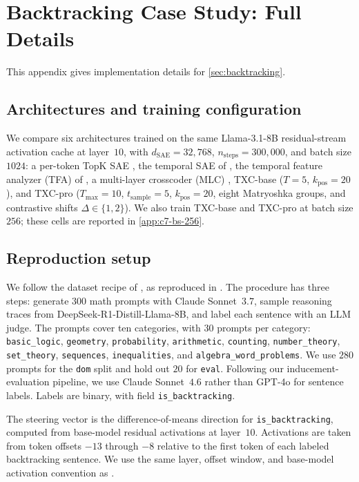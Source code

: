 \section{Backtracking Case Study: Full Details}
\label{app:c7}

This appendix gives implementation details for \cref{sec:backtracking}.

\subsection{Architectures and training configuration}
\label{app:c7-archs}

We compare six architectures trained on the same Llama-3.1-8B residual-stream activation cache at layer~$10$, with $d_{\text{SAE}} = 32{,}768$, $n_{\text{steps}} = 300{,}000$, and batch size $1024$: a per-token TopK SAE \cite{gao2024scaling}, the temporal SAE of \citet{bhalla2025tsae}, the temporal feature analyzer (TFA) of \citet{lubana2025priors}, a multi-layer crosscoder (MLC) \cite{lindsey2024sparsecrosscoders}, TXC-base ($T = 5$, $k_{\text{pos}} = 20$), and TXC-pro ($T_{\max} = 10$, $t_{\text{sample}} = 5$, $k_{\text{pos}} = 20$, eight Matryoshka groups, and contrastive shifts $\Delta \in \{1,2\}$). We also train TXC-base and TXC-pro at batch size $256$; these cells are reported in \cref{app:c7-bs-256}.

\subsection{Reproduction setup}
\label{app:c7-stage-a}

We follow the dataset recipe of \citet{venhoff2025steering}, as reproduced in \citet[Appendix C]{ward2025reasoning}. The procedure has three steps: generate $300$ math prompts with Claude Sonnet~$3.7$, sample reasoning traces from DeepSeek-R1-Distill-Llama-8B, and label each sentence with an LLM judge. The prompts cover ten categories, with $30$ prompts per category: \texttt{basic\_logic}, \texttt{geometry}, \texttt{probability}, \texttt{arithmetic}, \texttt{counting}, \texttt{number\_theory}, \texttt{set\_theory}, \texttt{sequences}, \texttt{inequalities}, and \texttt{algebra\_word\_problems}. We use $280$ prompts for the \texttt{dom} split and hold out $20$ for \texttt{eval}. Following our inducement-evaluation pipeline, we use Claude Sonnet~$4.6$ rather than GPT-4o for sentence labels. Labels are binary, with field \texttt{is\_backtracking}.

The steering vector is the difference-of-means direction for \texttt{is\_backtracking}, computed from base-model residual activations at layer~$10$. Activations are taken from token offsets $-13$ through $-8$ relative to the first token of each labeled backtracking sentence. We use the same layer, offset window, and base-model activation convention as \citet[Sec.~3.1, Appendix B.1]{ward2025reasoning}.

